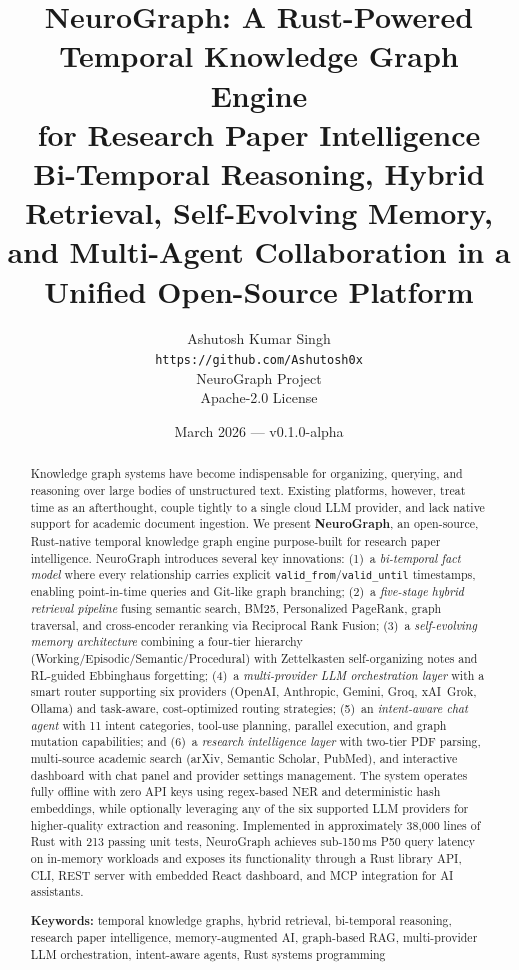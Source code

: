 \documentclass[11pt,twocolumn]{article}
\title{%
  \textbf{NeuroGraph: A Rust-Powered Temporal Knowledge Graph Engine\\
  for Research Paper Intelligence}\\[6pt]
  \large Bi-Temporal Reasoning, Hybrid Retrieval, Self-Evolving Memory,\\
  and Multi-Agent Collaboration in a Unified Open-Source Platform
}
\author{
  Ashutosh Kumar Singh\\
  \small \texttt{https://github.com/Ashutosh0x}\\[2pt]
  \small NeuroGraph Project\\
  \small Apache-2.0 License
}
\date{March 2026 — v0.1.0-alpha}
\begin{document}
\maketitle

\begin{abstract}
\noindent
Knowledge graph systems have become indispensable for organizing, querying, and reasoning over large bodies of unstructured text. Existing platforms, however, treat time as an afterthought, couple tightly to a single cloud LLM provider, and lack native support for academic document ingestion. We present \textbf{NeuroGraph}, an open-source, Rust-native temporal knowledge graph engine purpose-built for research paper intelligence. NeuroGraph introduces several key innovations: (1)~a \emph{bi-temporal fact model} where every relationship carries explicit \texttt{valid\_from}/\texttt{valid\_until} timestamps, enabling point-in-time queries and Git-like graph branching; (2)~a \emph{five-stage hybrid retrieval pipeline} fusing semantic search, BM25, Personalized PageRank, graph traversal, and cross-encoder reranking via Reciprocal Rank Fusion; (3)~a \emph{self-evolving memory architecture} combining a four-tier hierarchy (Working/Episodic/Semantic/Procedural) with Zettelkasten self-organizing notes and RL-guided Ebbinghaus forgetting; (4)~a \emph{multi-provider LLM orchestration layer} with a smart router supporting six providers (OpenAI, Anthropic, Gemini, Groq, xAI~Grok, Ollama) and task-aware, cost-optimized routing strategies; (5)~an \emph{intent-aware chat agent} with 11 intent categories, tool-use planning, parallel execution, and graph mutation capabilities; and (6)~a \emph{research intelligence layer} with two-tier PDF parsing, multi-source academic search (arXiv, Semantic Scholar, PubMed), and interactive dashboard with chat panel and provider settings management. The system operates fully offline with zero API keys using regex-based NER and deterministic hash embeddings, while optionally leveraging any of the six supported LLM providers for higher-quality extraction and reasoning. Implemented in approximately 38{,}000 lines of Rust with 213 passing unit tests, NeuroGraph achieves sub-150\,ms P50 query latency on in-memory workloads and exposes its functionality through a Rust library API, CLI, REST server with embedded React dashboard, and MCP integration for AI assistants.

\medskip
\noindent\textbf{Keywords:} temporal knowledge graphs, hybrid retrieval, bi-temporal reasoning, research paper intelligence, memory-augmented AI, graph-based RAG, multi-provider LLM orchestration, intent-aware agents, Rust systems programming
\end{abstract}
\end{document}
